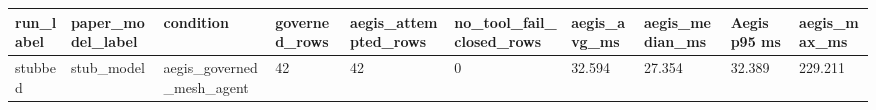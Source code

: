 \begin{tabular}{llllllllll}
 \hline
run\_label & paper\_model\_label & condition & governed\_rows & aegis\_attempted\_rows & no\_tool\_fail\_closed\_rows & aegis\_avg\_ms & aegis\_median\_ms & Aegis p95 ms & aegis\_max\_ms \\
 \hline
stubbed & stub\_model & aegis\_governed\_mesh\_agent & 42 & 42 & 0 & 32.594 & 27.354 & 32.389 & 229.211 \\
 \hline
\end{tabular}
